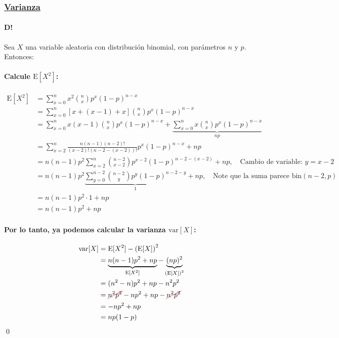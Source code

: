 \documentclass[8pt]{article}
\newcommand{\Cancel}[2][black]{{\color{#1}\cancel{\color{black}#2}}} %
\begin{document}
\subsubsection*{\hyperref[subsec:varianza_binom_tag]{Varianza}}
\label{subsec:varianza_binom}

\paragraph{D!} Sea $X$ una variable aleatoria con distribución binomial, con parámetros $n$ y $p$. Entonces:

\paragraph*{Calcule $\text{E}[X^2]$:}

\begin{align*}
    \text{E}[X^2] &= \sum_{x=0}^n x^2 \binom{n}{x} p^x (1-p)^{n-x} \\
    &= \sum_{x=0}^n [x+(x-1)+x]\binom{n}{x} p^x (1-p)^{n-x} \\
    &= \sum_{x=0}^n x(x-1) \binom{n}{x} p^x (1-p)^{n-x} + \underbrace{\sum_{x=0}^n x \binom{n}{x} p^x (1-p)^{n-x}}_{np} \\ 
    &= \sum_{x=2}^n \frac{n(n-1)(n-2)!}{(x-2)!(n-2-(x-2))!} p^x (1-p)^{n-x} + np \\
    &= n(n-1)p^2 \sum_{x=2}^n \binom{n-2}{x-2} p^{x-2} (1-p)^{n-2-(x-2)} + np, \quad \text{Cambio de variable: } y = x-2 \\
    &= n(n-1)p^2 \underbrace{\sum_{y=0}^{n-2} \binom{n-2}{y} p^y (1-p)^{n-2-y}}_{1} + np, \quad \text{Note que la suma parece bin} (n-2, p) \\
    &= n(n-1)p^2 \cdot 1 + np \\
    &= n(n-1)p^2 + np
\end{align*}

\paragraph*{Por lo tanto, ya podemos calcular la varianza $\text{var}[X]$:}

\begin{align*}
    \text{var}[X] &= \text{E}[X^2] - \left(\text{E}[X]\right)^2 \\
    &= \underbrace{n(n-1)p^2 + np}_{\text{E}[X^2]} - \underbrace{(np)^2}_{\left(\text{E}[X]\right)^2} \\
    &= (n^2-n)p^2 + np - n^2p^2 \\
    &= \Cancel[red]{n^2p^2} - np^2 + np - \Cancel[red]{n^2p^2} \\
    &=  -np^2 + np \\
    &=  np(1-p)
\end{align*}\qed
 
\end{document}
